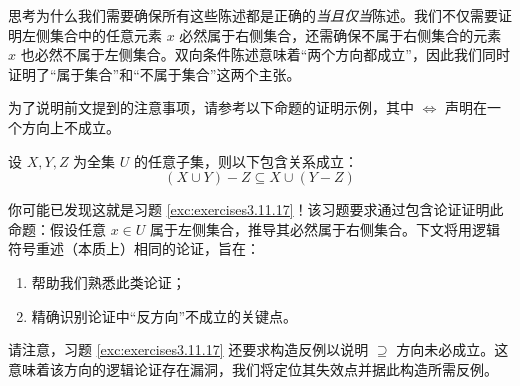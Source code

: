 思考为什么我们需要确保所有这些陈述都是正确的\emph{当且仅当}陈述。我们不仅需要证明左侧集合中的任意元素 $x$ 必然属于右侧集合，还需确保不属于右侧集合的元素 $x$ 也必然不属于左侧集合。双向条件陈述意味着``两个方向都成立''，因此我们同时证明了``属于集合''和``不属于集合''这两个主张。

为了说明前文提到的注意事项，请参考以下命题的证明示例，其中 $\iff$ 声明在一个方向上不成立。

\begin{proposition}\label{prop:proposition4.6.11}
    设 $X, Y, Z$ 为全集 $U$ 的任意子集，则以下包含关系成立：
    \[(X \cup Y ) - Z \subseteq X \cup (Y - Z)\]
\end{proposition}

你可能已发现这就是习题 \ref{exc:exercises3.11.17}！该习题要求通过包含论证证明此命题：假设任意 $x \in U$ 属于左侧集合，推导其必然属于右侧集合。下文将用逻辑符号重述（本质上）相同的论证，旨在：
\begin{enumerate}
    \item 帮助我们熟悉此类论证；
    \item 精确识别论证中``反方向''不成立的关键点。
\end{enumerate}
请注意，习题 \ref{exc:exercises3.11.17} 还要求构造反例以说明 $\supseteq$ 方向未必成立。这意味着该方向的逻辑论证存在漏洞，我们将定位其失效点并据此构造所需反例。

